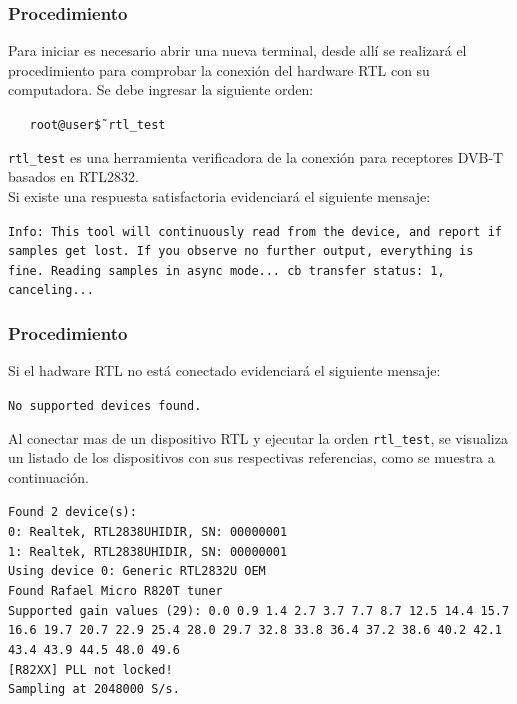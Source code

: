 \begin{frame}
\frametitle{Procedimiento}

Para iniciar es necesario abrir una nueva terminal, desde allí se realizará el procedimiento para comprobar la conexión del hardware RTL con su computadora. \vspace{2mm}
Se debe ingresar la siguiente orden:

\begin{block}{}
    \texttt
    {\ \ \ root@user\~\$ rtl\_test}
    \end{block}

\texttt{rtl\_test} es una herramienta verificadora de la conexión para receptores DVB-T basados en RTL2832. \\ \vspace{2mm}
Si existe una respuesta satisfactoria evidenciará el siguiente mensaje:

\begin{block}{}
    \texttt
    {Info: This tool will continuously read from the device, and report if samples get lost. If you observe no further output, everything is fine. Reading samples in async mode... cb transfer status: 1, canceling...}
    \end{block}

\end{frame}

\begin{frame}
\frametitle{Procedimiento}

Si el hadware RTL no está conectado evidenciará el siguiente mensaje:

\begin{block}{}
    \texttt
    {No supported devices found.}
    \end{block}

Al conectar mas de un dispositivo RTL y ejecutar la orden \texttt{rtl\_test}, se visualiza un listado de los dispositivos con sus respectivas referencias, como se muestra a continuación.
    
    \begin{block}{}
    \texttt
    {Found 2 device(s):\\
    0:  Realtek, RTL2838UHIDIR, SN: 00000001\\ 
    1:  Realtek, RTL2838UHIDIR, SN: 00000001\\
    Using device 0: Generic RTL2832U OEM\\ 
    Found Rafael Micro R820T tuner\\ 
    Supported gain values (29): 0.0 0.9 1.4 2.7 3.7 7.7 8.7 12.5 14.4 15.7 16.6 19.7 20.7 22.9 25.4 28.0 29.7 32.8 33.8 36.4 37.2 38.6 40.2 42.1 43.4 43.9 44.5 48.0 49.6\\
    {[R82XX]} PLL not locked!\\
    Sampling at 2048000 S/s. 
}
    \end{block}

\end{frame}

